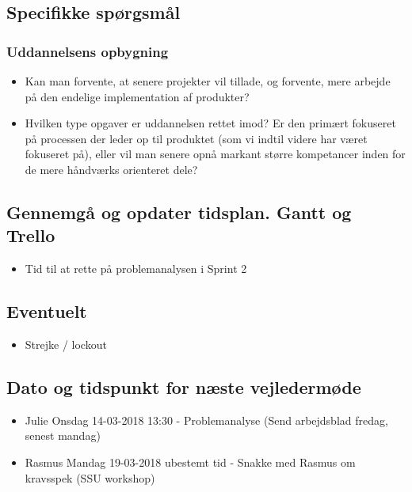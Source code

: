 \subsection{Specifikke spørgsmål}
\subsubsection{Uddannelsens opbygning}
    \begin{itemize}
        \item Kan man forvente, at senere projekter vil tillade, og forvente, mere arbejde på den endelige implementation af produkter?
        \item Hvilken type opgaver er uddannelsen rettet imod? Er den primært fokuseret på processen der leder op til produktet (som vi indtil videre har været fokuseret på), eller vil man senere opnå markant større kompetancer inden for de mere håndværks orienteret dele? 
    \end{itemize}
\subsection{Gennemgå og opdater tidsplan. Gantt og Trello}
    \begin{itemize}
        \item Tid til at rette på problemanalysen i Sprint 2
    \end{itemize}
\subsection{Eventuelt}
    \begin{itemize}
        \item Strejke / lockout
    \end{itemize}
\subsection{Dato og tidspunkt for næste vejledermøde}
    \begin{itemize}
        \item Julie Onsdag 14-03-2018 13:30 - Problemanalyse (Send arbejdsblad fredag, senest mandag)
        \item Rasmus Mandag 19-03-2018 ubestemt tid - Snakke med Rasmus om kravsspek (SSU workshop)
    \end{itemize}